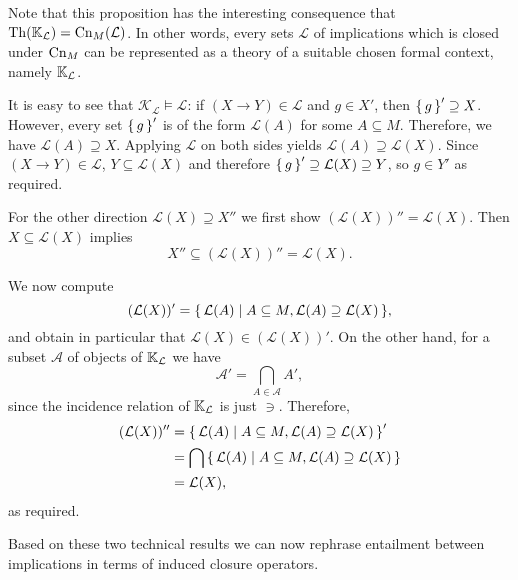 Note that this proposition has the interesting consequence that $\operatorname{Th}({\mathbb{K}}_{\mathcal{L}})
= \operatorname{Cn}_M(\mathcal{L})$.  In other words, every sets $\mathcal{L}$ of implications which is
closed under $\operatorname{Cn}_M$ can be represented as a theory of a suitable chosen formal context,
namely ${\mathbb{K}}_{\mathcal{L}}$.

\begin{Proof}
  It is easy to see that $\mathcal{K}_{\mathcal{L}} \models \mathcal{L}$: if $(X \to Y)
  \in \mathcal{L}$ and $g \in X'$, then ${\{\,g\,\}}' \supseteq X$.  However, every set
  ${\{\,g\,\}}'$ is of the form $\mathcal{L}(A)$ for some $A \subseteq M$.  Therefore, we have
  $\mathcal{L}(A) \supseteq X$.  Applying $\mathcal{L}$ on both sides yields
  $\mathcal{L}(A) \supseteq \mathcal{L}(X)$.  Since $(X \to Y) \in \mathcal{L}$, $Y
  \subseteq \mathcal{L}(X)$ and therefore ${\{\,g\,\}}' \supseteq \mathcal{L}(X) \supseteq Y$,
  so $g \in Y'$ as required.

  For the other direction $\mathcal{L}(X) \supseteq X''$ we first show $(\mathcal{L}(X))''
  = \mathcal{L}(X)$.  Then $X \subseteq \mathcal{L}(X)$ implies
  \begin{equation*}
    X'' \subseteq (\mathcal{L}(X))'' = \mathcal{L}(X).
  \end{equation*}

  We now compute
  \begin{equation*}
    (\mathcal{L}(X))' = {\{\, \mathcal{L}(A) \mid A \subseteq M, \mathcal{L}(A) \supseteq
      \mathcal{L}(X) \,\}},
  \end{equation*}
  and obtain in particular that $\mathcal{L}(X) \in (\mathcal{L}(X))'$.  On the other
  hand, for a subset $\mathcal{A}$ of objects of ${\mathbb{K}}_{\mathcal{L}}$ we have
  \begin{equation*}
    \mathcal{A}' = \bigcap_{A \in \mathcal{A}} A',
  \end{equation*}
  since the incidence relation of ${\mathbb{K}}_{\mathcal{L}}$ is just $\ni$.  Therefore,
  \begin{align*}
    (\mathcal{L}(X))'' &= {\{\, \mathcal{L}(A) \mid A \subseteq M, \mathcal{L}(A)
      \supseteq \mathcal{L}(X) \,\}}' \\
    &= \bigcap {\ensuremath{\{\, \mathcal{L}(A) \mid A \subseteq M, \mathcal{L}(A) \supseteq
      \mathcal{L}(X) \,\}}} \\
    &= \mathcal{L}(X),
  \end{align*}
  as required.
\end{Proof}

Based on these two technical results we can now rephrase entailment between implications
in terms of induced closure operators.

